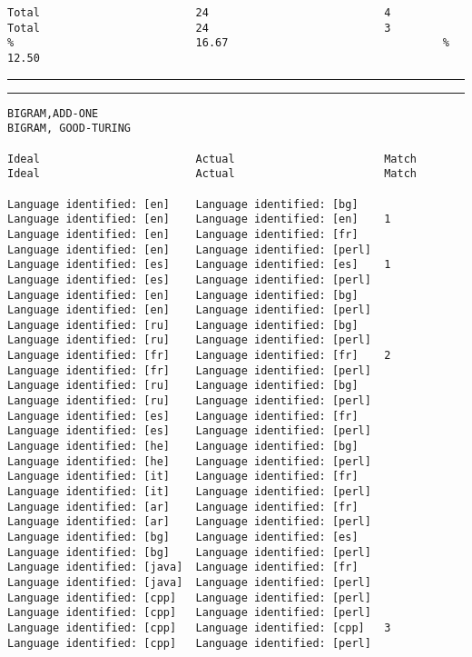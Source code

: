 \begin{verbatim}
Total                        24                           4        Total                        24                           3
%                            16.67                                 %                            12.50
\end{verbatim}
\vskip4pt\hrule

\clearpage

\tiny
\hrule\vskip4pt
\begin{verbatim}
BIGRAM,ADD-ONE                                                     BIGRAM, GOOD-TURING

Ideal                        Actual                       Match    Ideal                        Actual                       Match

Language identified: [en]    Language identified: [bg]             Language identified: [en]    Language identified: [en]    1
Language identified: [en]    Language identified: [fr]             Language identified: [en]    Language identified: [perl]
Language identified: [es]    Language identified: [es]    1        Language identified: [es]    Language identified: [perl]
Language identified: [en]    Language identified: [bg]             Language identified: [en]    Language identified: [perl]
Language identified: [ru]    Language identified: [bg]             Language identified: [ru]    Language identified: [perl]
Language identified: [fr]    Language identified: [fr]    2        Language identified: [fr]    Language identified: [perl]
Language identified: [ru]    Language identified: [bg]             Language identified: [ru]    Language identified: [perl]
Language identified: [es]    Language identified: [fr]             Language identified: [es]    Language identified: [perl]
Language identified: [he]    Language identified: [bg]             Language identified: [he]    Language identified: [perl]
Language identified: [it]    Language identified: [fr]             Language identified: [it]    Language identified: [perl]
Language identified: [ar]    Language identified: [fr]             Language identified: [ar]    Language identified: [perl]
Language identified: [bg]    Language identified: [es]             Language identified: [bg]    Language identified: [perl]
Language identified: [java]  Language identified: [fr]             Language identified: [java]  Language identified: [perl]
Language identified: [cpp]   Language identified: [perl]           Language identified: [cpp]   Language identified: [perl]
Language identified: [cpp]   Language identified: [cpp]   3        Language identified: [cpp]   Language identified: [perl]

\end{verbatim}

